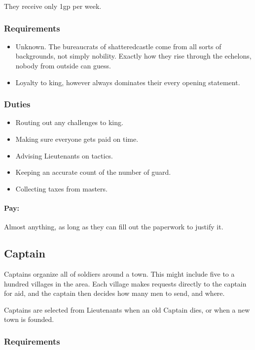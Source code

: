 \begin{multicols}{2}
They receive only 1gp per week.

\subsubsection{Requirements}

\begin{itemize}
  \item
  Unknown.
  The bureaucrats of \gls{shatteredcastle} come from all sorts of backgrounds, not simply nobility.
  Exactly how they rise through the echelons, nobody from outside can guess.
  \item
  Loyalty to \gls{king}, however always dominates their every opening statement.
\end{itemize}

\subsubsection{Duties}

\begin{itemize}
  \item
  Routing out any challenges to \gls{king}.
  \item
  Making sure everyone gets paid on time.
  \item
  Advising Lieutenants on tactics.
  \item
  Keeping an accurate count of the number of \gls{guard}.
  \item
  Collecting taxes from masters.
\end{itemize}

\paragraph{Pay:}
Almost anything, as long as they can fill out the paperwork to justify it.

\subsection{Captain}

Captains organize all of soldiers around a town.
This might include five to a hundred villages in the area.
Each village makes requests directly to the captain for aid, and the captain then decides how many men to send, and where.

Captains are selected from Lieutenants when an old Captain dies, or when a new town is founded.

\subsubsection{Requirements}


\end{multicols}
